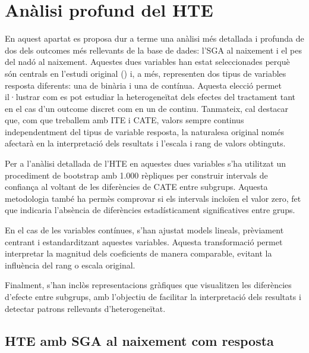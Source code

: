 \documentclass[../main.tex]{subfiles}
\begin{document}
    \section{Anàlisi profund del HTE} 
    \label{sec:anal_profun_SGA}
    
    En aquest apartat es proposa dur a terme una anàlisi més detallada i profunda de dos dels outcomes més rellevants de la base de dades: l’SGA al naixement i el pes del nadó al naixement. Aquestes dues variables han estat seleccionades perquè són centrals en l’estudi original (\cite{parct_original}) i, a més, representen dos tipus de variables resposta diferents: una de binària i una de contínua.
    Aquesta elecció permet il·lustrar com es pot estudiar la heterogeneïtat dels efectes del tractament tant en el cas d’un outcome discret com en un de continu. Tanmateix, cal destacar que, com que treballem amb ITE i CATE, valors sempre continus independentment del tipus de variable resposta, la naturalesa original només afectarà en la interpretació dels resultats i l’escala i rang de valors obtinguts.\par
    Per a l’anàlisi detallada de l’HTE en aquestes dues variables s’ha utilitzat un procediment de bootstrap amb 1.000 rèpliques per construir intervals de confiança al voltant de les diferències de CATE entre subgrups. Aquesta metodologia també ha permès comprovar si els intervals incloïen el valor zero, fet que indicaria l’absència de diferències estadísticament significatives entre grups.\par
    En el cas de les variables contínues, s’han ajustat models lineals, prèviament centrant i estandarditzant aquestes variables. Aquesta transformació permet interpretar la magnitud dels coeficients de manera comparable, evitant la influència del rang o escala original.\par
    Finalment, s’han inclòs representacions gràfiques que visualitzen les diferències d’efecte entre subgrups, amb l’objectiu de facilitar la interpretació dels resultats i detectar patrons rellevants d’heterogeneïtat.



    \subsection{HTE amb SGA al naixement com resposta}\label{subsec:profund_SGA}
\end{document}
